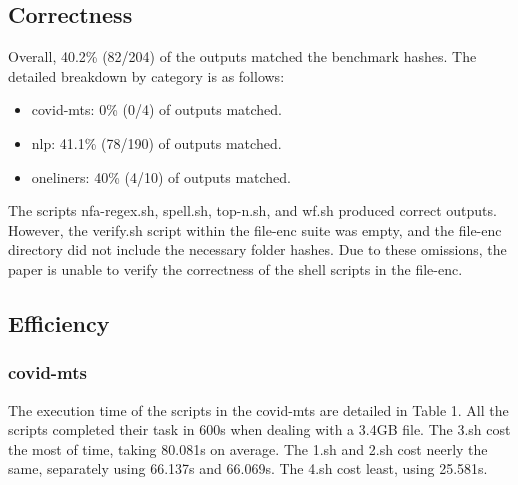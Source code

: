 \documentclass[sigplan, screen, 10pt]{acmart}
\begin{document}
\subsection{Correctness}
Overall, 40.2\% (82/204) of the outputs matched the benchmark hashes. The detailed breakdown by category is as follows:
\begin{itemize}
    \item covid-mts: 0\% (0/4) of outputs matched.
    \item nlp: 41.1\% (78/190) of outputs matched.
    \item oneliners: 40\% (4/10) of outputs matched.
\end{itemize}
The scripts nfa-regex.sh, spell.sh, top-n.sh, and wf.sh produced correct outputs.
However, the verify.sh script within the file-enc suite was empty, and the file-enc directory did not include the necessary folder hashes.
Due to these omissions, the paper is unable to verify the correctness of the shell scripts in the file-enc.\newline


\subsection{Efficiency}
\subsubsection{covid-mts}
The execution time of the scripts in the covid-mts are detailed in Table 1.
All the scripts completed their task in 600s when dealing with a 3.4GB file.
The 3.sh cost the most of time, taking 80.081s on average.
The 1.sh and 2.sh cost neerly the same, separately using 66.137s and 66.069s.
The 4.sh cost least, using 25.581s.\newline
 
\end{document}
